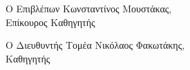 \begin{minipage}[!t]{3.0in}
\Large
\begin{center}
Ο Επιβλέπων
\vskip1cm
Κωνσταντίνος Μουστάκας,\\ Επίκουρος Καθηγητής
\end{center}
\end{minipage}
\hspace{0.27in}
\begin{minipage}[!t]{3.0in}
\Large
\begin{center}
Ο Διευθυντής Τομέα
\vskip1cm
Νικόλαος Φακωτάκης,\\ Καθηγητής
\end{center}
\end{minipage}
\clearpage
\clearpage
\null\clearpage %


